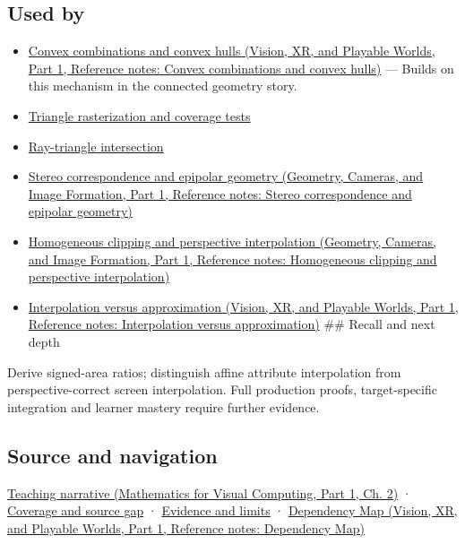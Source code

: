 \subsection{Used by}\label{appendix-02b9d9a81dca-used-by}

\hypertarget{appendix-02b9d9a81dca-used-by}{}

\begin{itemize}
\item
  \href{../07-Vision-XR-and-Playable-Worlds-P01/main.pdf\#appendix-0026ec42c9d5}{Convex combinations and convex hulls (Vision, XR, and Playable Worlds, Part 1, Reference notes: Convex combinations and convex hulls)} --- Builds on this mechanism in the connected geometry story.
\item
  \hyperref[appendix-ed3f9bc298fe]{Triangle rasterization and coverage tests}
\item
  \hyperref[appendix-47ac1bd6d144]{Ray-triangle intersection}
\item
  \href{../03-Geometry-Cameras-and-Image-Formation-P01/main.pdf\#appendix-c4e98b6e4001}{Stereo correspondence and epipolar geometry (Geometry, Cameras, and Image Formation, Part 1, Reference notes: Stereo correspondence and epipolar geometry)}
\item
  \href{../03-Geometry-Cameras-and-Image-Formation-P01/main.pdf\#appendix-40426e4b2103}{Homogeneous clipping and perspective interpolation (Geometry, Cameras, and Image Formation, Part 1, Reference notes: Homogeneous clipping and perspective interpolation)}
\item
  \href{../07-Vision-XR-and-Playable-Worlds-P01/main.pdf\#appendix-0c2a5f69851e}{Interpolation versus approximation (Vision, XR, and Playable Worlds, Part 1, Reference notes: Interpolation versus approximation)} \#\# Recall and next depth
\end{itemize}

Derive signed-area ratios; distinguish affine attribute interpolation from perspective-correct screen interpolation. Full production proofs, target-specific integration and learner mastery require further evidence.

\subsection{Source and navigation}\label{appendix-02b9d9a81dca-source-and-navigation}

\hypertarget{appendix-02b9d9a81dca-source-and-navigation}{}

\href{../02-Mathematics-for-Visual-Computing-P01/main.pdf\#01-foundations-i-ch018-the-sensor-needs-coordinates-inside-the-triangle}{Teaching narrative (Mathematics for Visual Computing, Part 1, Ch. 2)} · \hyperref[appendix-fd090d982a15-phase-6---parts-501-600]{Coverage and source gap} · \hyperref[appendix-a103e7846d21-phase-6---source-analysis-and-verification]{Evidence and limits} · \href{../07-Vision-XR-and-Playable-Worlds-P01/main.pdf\#appendix-4ad47bdd269a}{Dependency Map (Vision, XR, and Playable Worlds, Part 1, Reference notes: Dependency Map)}

